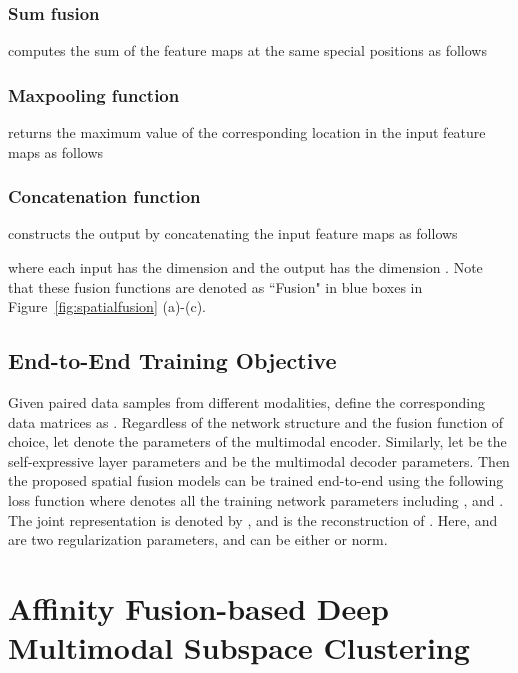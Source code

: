 \documentclass[journal]{IEEEtran}
\begin{document}
\subsubsection{Sum fusion } computes the sum of the feature maps at the same special positions as follows  



\subsubsection{Maxpooling function }  returns the maximum value of the corresponding location in the input feature maps as follows


\subsubsection{Concatenation function } constructs the output by concatenating the input feature maps as follows		

where each input has the dimension  and the output has the dimension .  Note that these fusion functions are denoted as ``Fusion" in blue boxes in Figure~\ref{fig:spatialfusion} (a)-(c).







\subsection{End-to-End Training Objective}
Given  paired data samples  from  different modalities, define the corresponding data matrices as .  Regardless of the network structure and the fusion function of choice, let   denote the parameters of the multimodal encoder.		 Similarly, let  be the self-expressive layer parameters and  be the multimodal decoder parameters.  Then the proposed spatial fusion models can be  trained end-to-end using the following loss function 
where  denotes all the training network parameters including ,   and .		The joint representation is denoted by , and  is the reconstruction of . Here,  and  are two regularization parameters,  and    can be either  or  norm. 



\section{Affinity Fusion-based Deep Multimodal Subspace Clustering}\label{sec:affinity}
\end{document}
